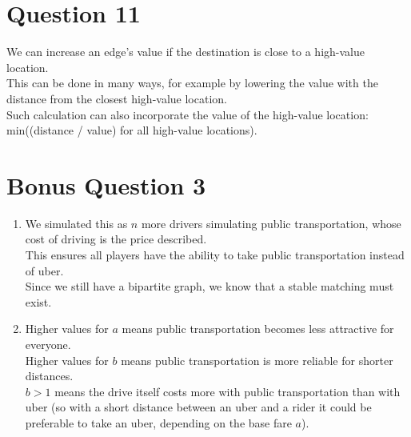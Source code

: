\documentclass{article}
\begin{document}
\section{Question 11}
We can increase an edge's value if the destination is close to a high-value location.\\
This can be done in many ways, for example by lowering the value with the distance from the closest high-value location.\\ 
Such calculation can also incorporate the value of the high-value location: min((distance / value) for all high-value locations).

\section{Bonus Question 3}

\begin{enumerate}[label=(\alph*)]

    \item 
    We simulated this as $n$ more drivers simulating public transportation, whose cost of driving is the price described.\\
    This ensures all players have the ability to take public transportation instead of uber.\\
    Since we still have a bipartite graph, we know that a stable matching must exist.
    
    \item 
    Higher values for $a$ means public transportation becomes less attractive for everyone.\\
    Higher values for $b$ means public transportation is more reliable for shorter distances.\\
    $b>1$ means the drive itself costs more with public transportation than with uber (so with a short distance between an uber and a rider it could be preferable to take an uber, depending on the base fare $a$).\\

\end{enumerate}


\end{document}

